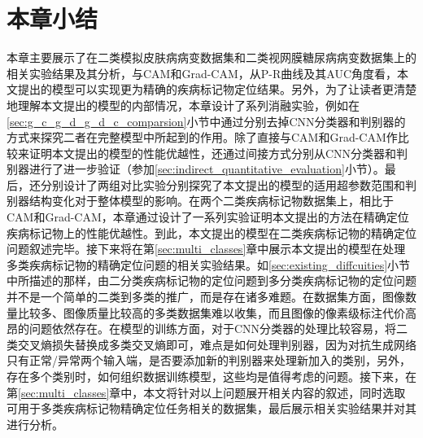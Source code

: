 \section{本章小结}
本章主要展示了在二类模拟皮肤病病变数据集和二类视网膜糖尿病病变数据集上的相关实验结果及其分析，与CAM和Grad-CAM，从P-R曲线及其AUC角度看，本文提出的模型可以实现更为精确的疾病标记物定位结果。另外，为了让读者更清楚地理解本文提出的模型的内部情况，本章设计了系列消融实验，例如在\ref{sec:g_c_g_d_g_d_c_comparsion}小节中通过分别去掉CNN分类器和判别器的方式来探究二者在完整模型中所起到的作用。除了直接与CAM和Grad-CAM作比较来证明本文提出的模型的性能优越性，还通过间接方式分别从CNN分类器和判别器进行了进一步验证（参加\ref{sec:indirect_quantitative_evaluation}小节）。最后，还分别设计了两组对比实验分别探究了本文提出的模型的适用超参数范围和判别器结构变化对于整体模型的影响。在两个二类疾病标记物数据集上，相比于CAM和Grad-CAM，本章通过设计了一系列实验证明本文提出的方法在精确定位疾病标记物上的性能优越性。到此，本文提出的模型在二类疾病标记物的精确定位问题叙述完毕。接下来将在第\ref{sec:multi_classes}章中展示本文提出的模型在处理多类疾病标记物的精确定位问题的相关实验结果。如\ref{sec:existing_diffcuities}小节中所描述的那样，由二分类疾病标记物的定位问题到多分类疾病标记物的定位问题并不是一个简单的二类到多类的推广，而是存在诸多难题。在数据集方面，图像数量比较多、图像质量比较高的多类数据集难以收集，而且图像的像素级标注代价高昂的问题依然存在。在模型的训练方面，对于CNN分类器的处理比较容易，将二类交叉熵损失替换成多类交叉熵即可，难点是如何处理判别器，因为对抗生成网络只有正常/异常两个输入端，是否要添加新的判别器来处理新加入的类别，另外，存在多个类别时，如何组织数据训练模型，这些均是值得考虑的问题。接下来，在第\ref{sec:multi_classes}章中，本文将针对以上问题展开相关内容的叙述，同时选取可用于多类疾病标记物精确定位任务相关的数据集，最后展示相关实验结果并对其进行分析。


